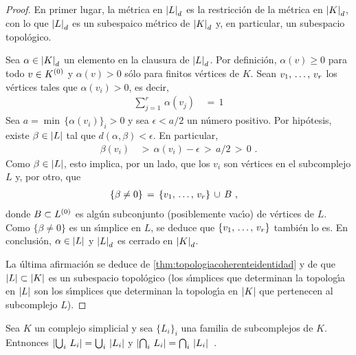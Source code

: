 \begin{proof}
	En primer lugar, la m\'{e}trica en $\geom{L}_{d}$ es la
	restricci\'{o}n de la m\'{e}trica en $\geom{K}_{d}$, con lo que
	$\geom{L}_{d}$ es un subespaico m\'{e}trico de $\geom{K}_{d}$
	y, en particular, un subespacio topol\'{o}gico.

	Sea $\alpha\in\geom{K}_{d}$ un elemento en la clausura de
	$\geom{L}_{d}$. Por definici\'{o}n, $\alpha(v)\geq 0$ para todo
	$v\in\qesq{0}{K}$ y $\alpha(v)>0$ s\'{o}lo para finitos
	v\'{e}rtices de $K$. Sean $\lista{v}{r}$ los v\'{e}rtices tales
	que $\alpha(v_{i})>0$, es decir,
	\begin{align*}
		\sum_{j=1}^{r}\,\alpha(v_{j}) & \,=\,1
	\end{align*}
	Sea $a=\min\,\{\alpha(v_{i})\}_{i}>0$ y sea $\epsilon<a/2$ un
	n\'{u}mero positivo. Por hip\'{o}tesis, existe $\beta\in\geom{L}$
	tal que $d(\alpha,\beta)<\epsilon$. En particular,
	\begin{align*}
		\beta(v_{i}) & \,>\,\alpha(v_{i})-\epsilon\,>\,a/2\,>\,0
		\text{ .}
	\end{align*}
	Como $\beta\in\geom{L}$, esto implica, por un lado, que los
	$v_{i}$ son v\'{e}rtices en el subcomplejo $L$ y, por otro, que
	\begin{align*}
		\{\beta\not =0\} & \,=\,\{\lista{v}{r}\}\,\cup\,B
		\text{ ,}
	\end{align*}
	donde $B\subset\qesq{0}{L}$ es alg\'{u}n subconjunto (posiblemente
	vac\'{\i}o) de v\'{e}rtices de $L$. Como $\{\beta\not =0\}$ es
	un s\'{\i}mplice en $L$, se deduce que $\{\lista{v}{r}\}$
	tambi\'{e}n lo es. En conclusi\'{o}n, $\alpha\in\geom{L}$ y
	$\geom{L}_{d}$ es cerrado en $\geom{K}_{d}$.

	La \'{u}ltima afirmaci\'{o}n se deduce de
	\ref{thm:topologiacoherenteidentidad} y de que
	$\geom{L}\subset\geom{K}$ es un subespacio topol\'{o}gico (los
	s\'{\i}mplices que determinan la topolog\'{\i}a en $\geom{L}$ son
	los s\'{\i}mplices que determinan la topolog\'{\i}a en $\geom{K}$
	que pertenecen al subcomplejo $L$).
\end{proof}

\begin{obsRealizacionUnionInterseccion}\label{obs:realizacionunioninterseccion}
	Sea $K$ un complejo simplicial y sea $\{L_{i}\}_{i}$ una familia
	de subcomplejos de $K$. Entnonces
	\begin{math}
		\geom{\bigcup_{i}\,L_{i}} = \bigcup_{i}\,\geom{L_{i}}
	\end{math}
	y
	\begin{math}
		\geom{\bigcap_{i}\,L_{i}} = \bigcap_{i}\,\geom{L_{i}}
	\end{math}~.
\end{obsRealizacionUnionInterseccion}


